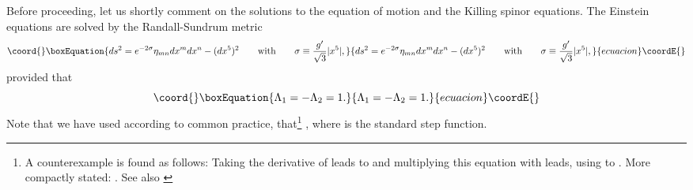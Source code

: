 \documentclass[a4paper,12pt, twoside]{article}
\numberwithin{equation}{section}
\begin{document}
\medskip

Before proceeding, let us shortly comment on the solutions to the 
equation of motion and the Killing spinor equations. The Einstein equations 
are solved by the Randall-Sundrum metric
\begin{equation}\coord{}\boxEquation{
ds^2 = e^{-2\sigma}\eta_{mn}dx^mdx^n-(d{x^5})^2\qquad  \mbox{with} 
\qquad\sigma\equiv \frac{g'}{\sqrt{3}}|x^5|,\label{rsmetric}
}{
ds^2 = e^{-2\sigma}\eta_{mn}dx^mdx^n-(d{x^5})^2\qquad  \mbox{with} 
\qquad\sigma\equiv \frac{g'}{\sqrt{3}}|x^5|,}{ecuacion}\coordE{}\end{equation}
provided that 
\begin{equation}\coord{}\boxEquation{
\Lambda_1=-\Lambda_2=1.\label{val2}
}{
\Lambda_1=-\Lambda_2=1.}{ecuacion}\coordE{}\end{equation}
Note that we have used according to common practice, that\footnote{A 
counterexample is found as follows: Taking the derivative of 
\coordHE{} leads to \coordHE{} and multiplying this equation 
with \coordHE{} leads, using \coordHE{} to \coordHE{}. 
More compactly stated: 
\coordHE{}. See also 
\cite{Conrad:1998ww}} \coordHE{}, where \myHighlight{$\theta$}\coordHE{} is the standard step function.
\end{document}
